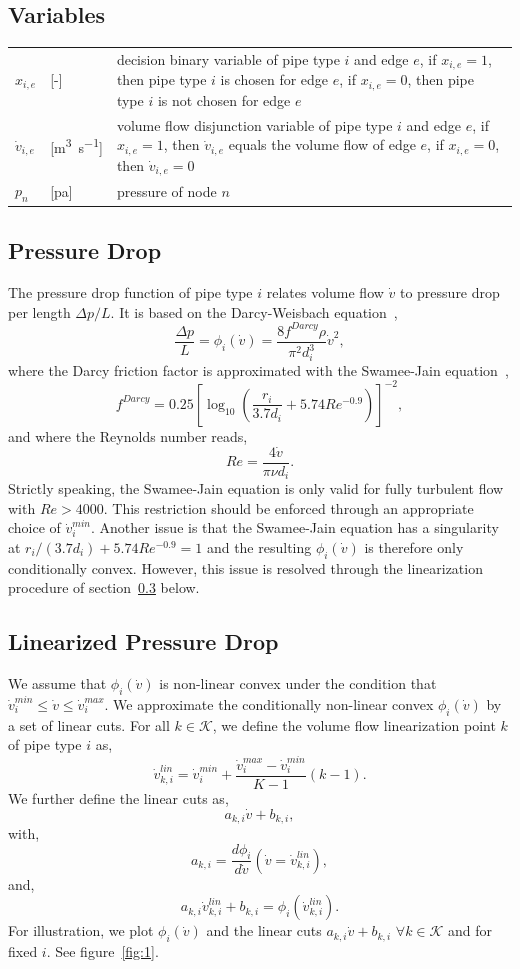 \documentclass[a4paper,10pt]{article}
\begin{document}
\subsection{Variables}\label{sec:hydraulicVariables}

\begin{tabularx}{\textwidth}{llX}
  $x_{i,e}$ &[-]& decision binary variable of pipe type $i$ and edge $e$,
  if $x_{i,e}=1$, then pipe type $i$ is chosen for edge $e$,
  if $x_{i,e}=0$, then pipe type $i$ is not chosen for edge $e$\\
  $\dot{v}_{i,e}$ &[\si{m^{3}.s^{-1}}]& volume flow disjunction variable of pipe type $i$ and edge $e$,
  if $x_{i,e}=1$, then $\dot{v}_{i,e}$ equals the volume flow of edge $e$,
  if $x_{i,e}=0$, then $\dot{v}_{i,e}=0$\\
  $p_n$ &[\si{pa}]& pressure of node $n$
\end{tabularx}

\subsection{Pressure Drop}
The pressure drop function of pipe type $i$ relates volume flow $\dot{v}$ to pressure drop per length $\Delta p/L$.
It is based on the Darcy-Weisbach equation~\cite{DarcyWeisbach},
$$\frac{\Delta p}{L}=\phi_i(\dot{v})=\frac{8 f^{Darcy}\rho}{\pi^2 d_i^3}\dot{v}^2,$$
where the Darcy friction factor is approximated with the Swamee-Jain equation~\cite{SwameeJain},
$$f^{Darcy}=0.25\left[\log_{10}\left(\frac{r_i}{3.7 d_i}+5.74 Re^{-0.9}\right)\right]^{-2},$$
and where the Reynolds number reads,
$$Re=\frac{4\dot{v}}{\pi \nu d_i}.$$
Strictly speaking, the Swamee-Jain equation is only valid for fully turbulent flow with $Re>4000$.
This restriction should be enforced through an appropriate choice of $\dot{v}_i^{min}$.
Another issue is that the Swamee-Jain equation has a singularity at $r_i/(3.7 d_i)+5.74 Re^{-0.9}=1$ and the resulting $\phi_i(\dot{v})$ is therefore only conditionally convex.
However, this issue is resolved through the linearization procedure of section~\ref{sec:lin} below.

\subsection{Linearized Pressure Drop}\label{sec:lin}

We assume that $\phi_i(\dot{v})$ is non-linear convex under the condition that $\dot{v}_i^{min}\le\dot{v}\le\dot{v}_i^{max}$. 
We approximate the conditionally non-linear convex $\phi_i(\dot{v})$ by a set of linear cuts. 
For all $k\in\mathcal{K}$, we define the volume flow linearization point $k$ of pipe type $i$ as,
$$\dot{v}_{k,i}^{lin} = \dot{v}_i^{min}+\frac{\dot{v}_i^{max}-\dot{v}_i^{min}}{K-1}(k-1).$$
We further define the linear cuts as,
$$a_{k,i}\dot{v}+b_{k,i},$$
with,
$$a_{k,i}=\frac{d \phi_i}{d \dot{v}}(\dot{v}=\dot{v}_{k,i}^{lin}),$$
and,
$$a_{k,i}\dot{v}_{k,i}^{lin}+b_{k,i}=\phi_i(\dot{v}_{k,i}^{lin}).$$
For illustration, we plot $\phi_i(\dot{v})$ and the linear cuts $a_{k,i}\dot{v}+b_{k,i}$ $\forall k\in\mathcal{K}$ and for fixed $i$.
See figure~\ref{fig:1}.
\end{document}
